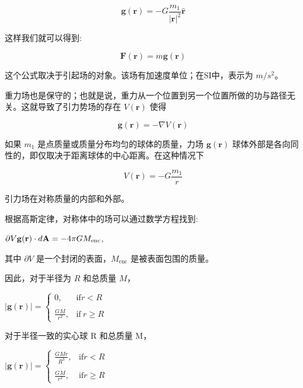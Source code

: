 \begin{equation}
\mathbf{g}(\mathbf{r}) = -G \frac{m_1}{|\mathbf{r}|^2} \hat{\mathbf{r}}~
\end{equation}

这样我们就可以得到:

\begin{equation}
\mathbf{F}(\mathbf{r}) = m \mathbf{g}(\mathbf{r})~
\end{equation}

这个公式取决于引起场的对象。该场有加速度单位；在SI中，表示为 $m/s^2$。

重力场也是保守的；也就是说，重力从一个位置到另一个位置所做的功与路径无关。这就导致了引力势场的存在 $V(\mathbf{r})$ 使得

\begin{equation}
\mathbf{g}(\mathbf{r}) = -\nabla V(\mathbf{r})~
\end{equation}

如果 $m_1$ 是点质量或质量分布均匀的球体的质量，力场 $\mathbf{g}(\mathbf{r})$ 球体外部是各向同性的，即仅取决于距离球体的中心距离。在这种情况下

\begin{equation}
V(\mathbf{r}) = -G \frac{m_1}{r}~
\end{equation}

引力场在对称质量的内部和外部。

根据高斯定律，对称体中的场可以通过数学方程找到:

$\partial V \\ \mathbf{g}(\mathbf{r}) \cdot d\mathbf{A} = -4\pi GM_{\text{enc}}$,

其中 $\partial V$ 是一个封闭的表面，$M_{\text{enc}}$ 是被表面包围的质量。

因此，对于半径为 $R$ 和总质量 $M$，

$\left| \mathbf{g}(\mathbf{r}) \right| = 
\begin{cases}
0, & \text{if}  r < R \\\\
\frac{GM}{r^2}, & \text{if} \ r \geq R
\end{cases}$

对于半径一致的实心球 R 和总质量 M，

$\left| \mathbf{g}(\mathbf{r}) \right| = 
\begin{cases}
\frac{GMr}{R^3}, & \text{if}  r < R \\\\
\frac{GM}{r^2}, & \text{if}  r \geq R
\end{cases}$

